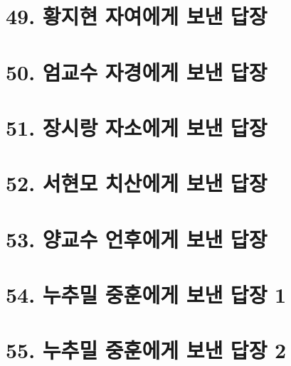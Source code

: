 \documentclass[12pt, a4paper, oneside]{book}
\let\stdsection\section
\renewcommand\section{\newpage\stdsection}
\begin{document}
 	\section{49. 황지현 자여에게 보낸 답장 }

%
 	\section{50. 엄교수 자경에게 보낸 답장 } 

%
 	\section{51. 장시랑 자소에게 보낸 답장 }

%
 	\section{52. 서현모 치산에게 보낸 답장 }

%
 	\section{53. 양교수 언후에게 보낸 답장 }

%
 	\section{54. 누추밀 중훈에게 보낸 답장 1 }

%
 	\section{55. 누추밀 중훈에게 보낸 답장 2 }
\end{document}
